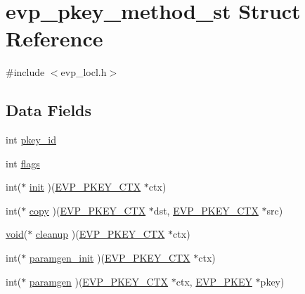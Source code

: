 \hypertarget{structevp__pkey__method__st}{}\section{evp\+\_\+pkey\+\_\+method\+\_\+st Struct Reference}
\label{structevp__pkey__method__st}


{\ttfamily \#include $<$evp\+\_\+locl.\+h$>$}

\subsection*{Data Fields}
\begin{DoxyCompactItemize}
\item 
int \hyperlink{structevp__pkey__method__st_a1021097b3af14d7ae24a3756def116d2}{pkey\+\_\+id}
\item 
int \hyperlink{structevp__pkey__method__st_ac8bf36fe0577cba66bccda3a6f7e80a4}{flags}
\item 
int($\ast$ \hyperlink{structevp__pkey__method__st_aa94500437e8367c69b7563f54d62af08}{init} )(\hyperlink{crypto_2ossl__typ_8h_aaadbb75633e4460a52864970a3b875de}{E\+V\+P\+\_\+\+P\+K\+E\+Y\+\_\+\+C\+TX} $\ast$ctx)
\item 
int($\ast$ \hyperlink{structevp__pkey__method__st_a48ccef4700fcee6a65e8fa43cd8efe5e}{copy} )(\hyperlink{crypto_2ossl__typ_8h_aaadbb75633e4460a52864970a3b875de}{E\+V\+P\+\_\+\+P\+K\+E\+Y\+\_\+\+C\+TX} $\ast$dst, \hyperlink{crypto_2ossl__typ_8h_aaadbb75633e4460a52864970a3b875de}{E\+V\+P\+\_\+\+P\+K\+E\+Y\+\_\+\+C\+TX} $\ast$src)
\item 
\hyperlink{hw__4758__cca_8h_afad4d591c7931ff6dc5bf69c76c96aa0}{void}($\ast$ \hyperlink{structevp__pkey__method__st_ad9db33d86d70609a446294f2543e931f}{cleanup} )(\hyperlink{crypto_2ossl__typ_8h_aaadbb75633e4460a52864970a3b875de}{E\+V\+P\+\_\+\+P\+K\+E\+Y\+\_\+\+C\+TX} $\ast$ctx)
\item 
int($\ast$ \hyperlink{structevp__pkey__method__st_a5edf7a6110c87d258012d89ed9afe02f}{paramgen\+\_\+init} )(\hyperlink{crypto_2ossl__typ_8h_aaadbb75633e4460a52864970a3b875de}{E\+V\+P\+\_\+\+P\+K\+E\+Y\+\_\+\+C\+TX} $\ast$ctx)
\item 
int($\ast$ \hyperlink{structevp__pkey__method__st_af50379bcd5912a5922f07c161d37d6c3}{paramgen} )(\hyperlink{crypto_2ossl__typ_8h_aaadbb75633e4460a52864970a3b875de}{E\+V\+P\+\_\+\+P\+K\+E\+Y\+\_\+\+C\+TX} $\ast$ctx, \hyperlink{crypto_2ossl__typ_8h_a2fca4fef9e4c7a2a739b1ea04acb56ce}{E\+V\+P\+\_\+\+P\+K\+EY} $\ast$pkey)

\end{DoxyCompactItemize}
